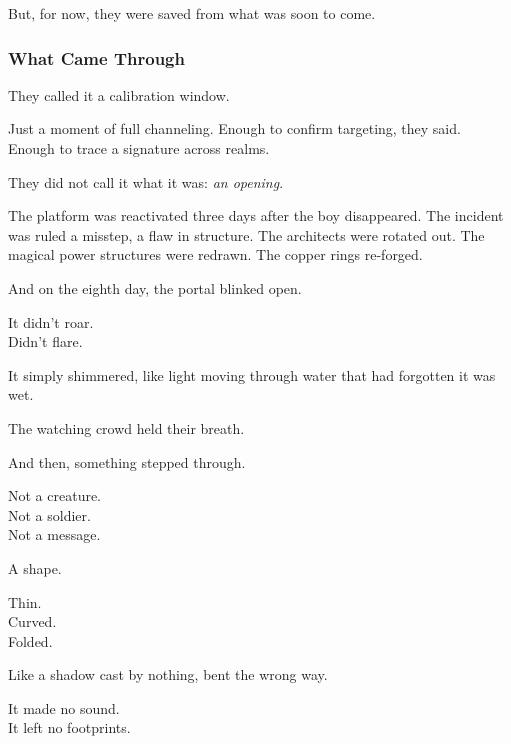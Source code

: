 \documentclass[12pt]{article}
\begin{document}
But, for now, they were saved from what was soon to come.

\dotfill

\subsubsection{What Came Through}

They called it a calibration window.

\vspace{0.5em}
Just a moment of full channeling. Enough to confirm targeting, they said. Enough to trace a signature across realms.

\vspace{0.5em}
They did not call it what it was: \textit{an opening}.

\vspace{0.5em}
The platform was reactivated three days after the boy disappeared. The incident was ruled a misstep, a flaw in structure. The architects were rotated out. The magical power structures were redrawn. The copper rings re-forged.

\vspace{0.5em}
And on the eighth day, the portal blinked open.

\vspace{0.5em}
It didn’t roar.\\
Didn’t flare.

\vspace{0.5em}
It simply shimmered, like light moving through water that had forgotten it was wet.

\vspace{0.5em}
The watching crowd held their breath.

\vspace{0.5em}
And then, something stepped through.

\vspace{0.5em}
Not a creature.\\
Not a soldier.\\
Not a message.

\vspace{0.5em}
A shape.

\vspace{0.5em}
Thin.\\
Curved.\\
Folded.

\vspace{0.5em}
Like a shadow cast by nothing, bent the wrong way.

\vspace{0.5em}
It made no sound.\\
It left no footprints.
\end{document}

